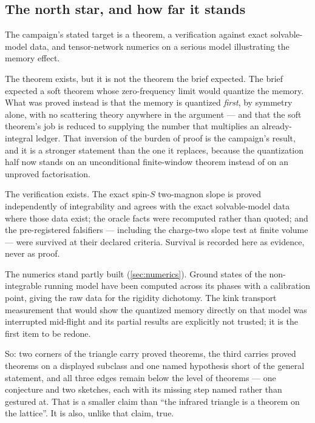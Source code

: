 \subsection{The north star, and how far it stands}

The campaign's stated target is a theorem, a verification against exact
solvable-model data, and tensor-network numerics on a serious model
illustrating the memory effect.

The theorem exists, but it is not the theorem the brief expected. The brief
expected a soft theorem whose zero-frequency limit would quantize the memory.
What was proved instead is that the memory is quantized \emph{first}, by
symmetry alone, with no scattering theory anywhere in the argument --- and
that the soft theorem's job is reduced to supplying the number that multiplies
an already-integral ledger. That inversion of the burden of proof is the
campaign's result, and it is a stronger statement than the one it replaces,
because the quantization half now stands on an unconditional finite-window
theorem instead of on an unproved factorisation.

The verification exists. The exact spin-$S$ two-magnon slope is proved
independently of integrability and agrees with the exact solvable-model data
where those data exist; the oracle facts were recomputed rather than quoted;
and the pre-registered falsifiers --- including the charge-two slope test at
finite volume --- were survived at their declared criteria. Survival is
recorded here as evidence, never as proof.

The numerics stand partly built (\cref{sec:numerics}). Ground states of the
non-integrable running model have been computed across its phases with a
calibration point, giving the raw data for the rigidity dichotomy. The kink
transport measurement that would show the quantized memory directly on that
model was interrupted mid-flight and its partial results are explicitly not
trusted; it is the first item to be redone.

So: two corners of the triangle carry proved theorems, the third carries
proved theorems on a displayed subclass and one named hypothesis short of the
general statement, and all three edges remain below the level of theorems ---
one conjecture and two sketches, each with its missing step named rather than
gestured at. That is a smaller claim than ``the infrared triangle is a theorem
on the lattice''. It is also, unlike that claim, true.
